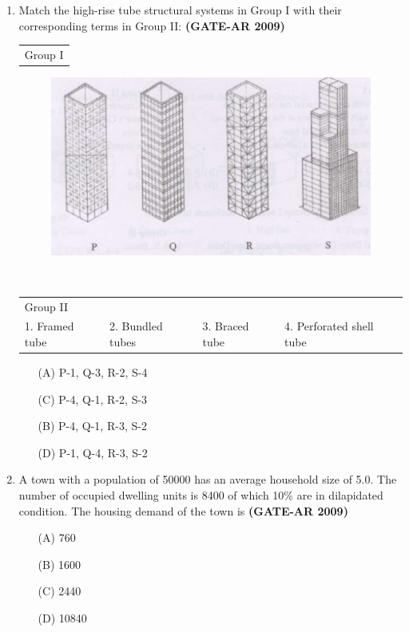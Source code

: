 \documentclass[a4paper,10pt]{article}
\begin{document}
\begin{enumerate}
    \item Match the high-rise tube structural systems in Group I with their corresponding terms in Group II: \hfill \textbf{(GATE-AR 2009)} \\
    \begin{tabular}{ p }
	Group I \\
	\end{tabular}
	\begin{figure}[h!]
        \centering
        \includegraphics[width=0.5\linewidth]{figs/img_02.jpg}
        \label{fig:Img02}
	\end{figure} \\
	\begin{tabular}{ p p p p }
	Group II & & & \\
	1. Framed tube & 2. Bundled tubes & 3. Braced tube & 4. Perforated shell tube \\
	\end{tabular}
	\begin{multicols}{2}
	\begin{itemize}
        \item[(A)] P-1, Q-3, R-2, S-4
        \item[(C)] P-4, Q-1, R-2, S-3
        \item[(B)] P-4, Q-1, R-3, S-2
        \item[(D)] P-1, Q-4, R-3, S-2
    \end{itemize}
	\end{multicols}

    \item A town with a population of 50000 has an average household size of 5.0. The number of occupied dwelling units is 8400 of which 10\% are in dilapidated condition. The housing demand of the town is \hfill \textbf{(GATE-AR 2009)}
    \begin{multicols}{4}
	\begin{itemize}
        \item[(A)] 760
        \item[(B)] 1600
        \item[(C)] 2440
        \item[(D)] 10840
    \end{itemize}
	\end{multicols}


\end{enumerate}
\end{document}
